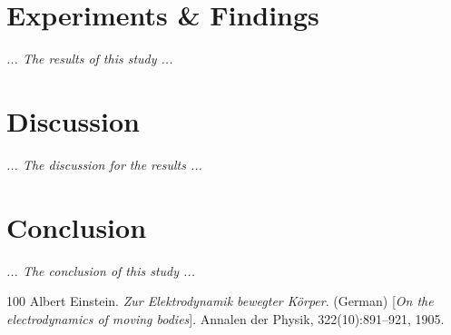 \documentclass[a4paper,12pt]{report}
\begin{document}
\section{Experiments \& Findings}
\textit{... The results of this study ...}
\newpage

\section{Discussion}
\textit{... The discussion for the results ...}
\newpage

\section{Conclusion}
\textit{... The conclusion of this study ...}




%
%
\clearpage


%
%
% 

%
%
\begin{thebibliography}{100}
 Albert Einstein. \textit{Zur Elektrodynamik bewegter K{\"o}rper}. (German) [\textit{On the electrodynamics of moving bodies}]. Annalen der Physik, 322(10):891–921, 1905.
\end{thebibliography}
\end{document}

